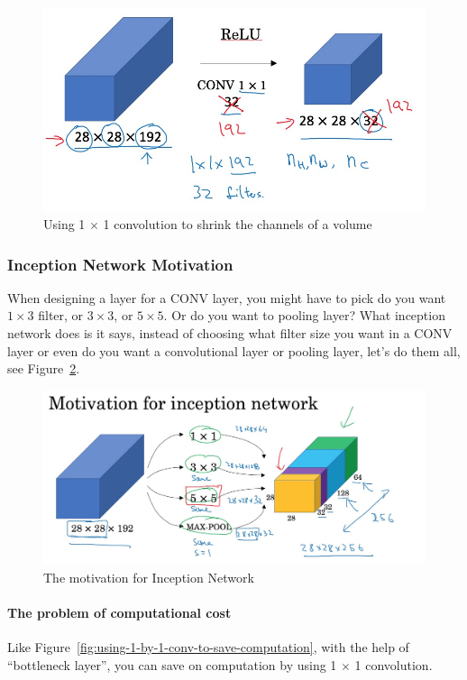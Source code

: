 \documentclass[UTF8]{article}
\begin{document}
\begin{figure}[htb]
    \centering
    \includegraphics[width=40em]{figures/using-1-by-1-conv}
    \caption{Using 1 $\times$ 1 convolution to shrink the channels of a volume}
    \label{fig:using-1-by-1-conv}
\end{figure}

\subsubsection{Inception Network Motivation}
When designing a layer for a CONV layer, you might have to pick do you want $1 \times 3$ filter,
or $3 \times 3$, or $5 \times 5$. Or do you want to pooling layer? What inception network does is
it says, instead of choosing what filter size you want in a CONV layer or even do you want a
convolutional layer or pooling layer, let's do them all, see Figure~\ref{fig:inception-motivation}.

\begin{figure}[htb]
    \centering
    \includegraphics[width=40em]{figures/inception-motivation}
    \caption{The motivation for Inception Network}
    \label{fig:inception-motivation}
\end{figure}

\paragraph{The problem of computational cost}
Like Figure~\ref{fig:using-1-by-1-conv-to-save-computation}, with the help of ``bottleneck layer'',
you can save on computation by using 1 $\times$ 1 convolution.
\end{document}
